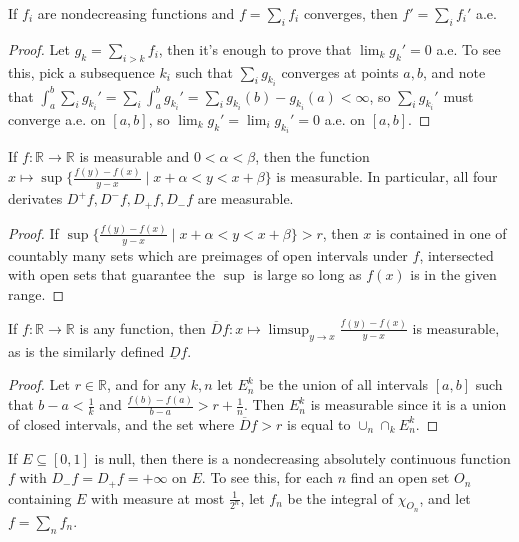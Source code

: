 \documentclass[letterpaper,11pt]{report}
\begin{document}
\begin{prop} If $f_i$ are nondecreasing functions and $f = \sum_i f_i$ converges, then $f' = \sum_i f_i'$ a.e.
\end{prop}
\begin{proof} Let $g_k = \sum_{i>k} f_i$, then it's enough to prove that $\lim_k g_k' = 0$ a.e. To see this, pick a subsequence $k_i$ such that $\sum_i g_{k_i}$ converges at points $a,b$, and note that $\int_a^b \sum_i g_{k_i}' = \sum_i \int_a^b g_{k_i}' = \sum_i g_{k_i}(b) - g_{k_i}(a) < \infty$, so $\sum_i g_{k_i}'$ must converge a.e. on $[a,b]$, so $\lim_k g_k' = \lim_i g_{k_i}' = 0$ a.e. on $[a,b]$.
\end{proof}

\begin{prop} If $f : \mathbb{R} \rightarrow \mathbb{R}$ is measurable and $0 < \alpha < \beta$, then the function $x \mapsto \sup\{\frac{f(y)-f(x)}{y-x} \mid x+\alpha < y < x+\beta\}$ is measurable. In particular, all four derivates $D^+f, D^-f, D_+f, D_-f$ are measurable.
\end{prop}
\begin{proof} If $\sup\{\frac{f(y)-f(x)}{y-x} \mid x+\alpha < y < x+\beta\} > r$, then $x$ is contained in one of countably many sets which are preimages of open intervals under $f$, intersected with open sets that guarantee the $\sup$ is large so long as $f(x)$ is in the given range.
\end{proof}

\begin{prop} If $f : \mathbb{R} \rightarrow \mathbb{R}$ is any function, then $\overline{D}f : x \mapsto \limsup_{y\rightarrow x} \frac{f(y)-f(x)}{y-x}$ is measurable, as is the similarly defined $\underline{D}f$.
\end{prop}
\begin{proof} Let $r \in \mathbb{R}$, and for any $k,n$ let $E^k_n$ be the union of all intervals $[a,b]$ such that $b-a < \frac{1}{k}$ and $\frac{f(b)-f(a)}{b-a} > r+\frac{1}{n}$. Then $E^k_n$ is measurable since it is a union of closed intervals, and the set where $\overline{D}f > r$ is equal to $\cup_n \cap_k E^k_n$.
\end{proof}

\begin{ex} If $E \subseteq [0,1]$ is null, then there is a nondecreasing absolutely continuous function $f$ with $D_-f = D_+f = +\infty$ on $E$. To see this, for each $n$ find an open set $O_n$ containing $E$ with measure at most $\frac{1}{2^n}$, let $f_n$ be the integral of $\chi_{O_n}$, and let $f = \sum_n f_n$.
\end{ex}
\end{document}

